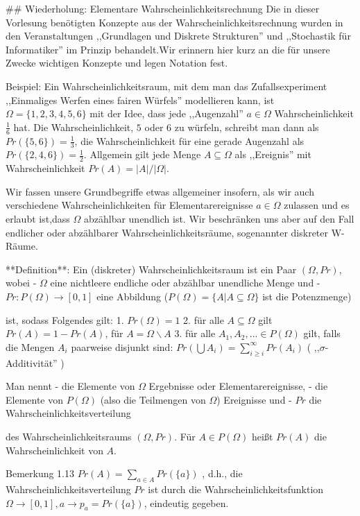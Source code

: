 \documentclass[a4paper]{article}
\begin{document}
\begin{multicols}{3}
    ## Wiederholung: Elementare Wahrscheinlichkeitsrechnung
    Die in dieser Vorlesung benötigten Konzepte aus der Wahrscheinlichkeitsrechnung wurden in den Veranstaltungen ,,Grundlagen und Diskrete Strukturen'' und ,,Stochastik für Informatiker'' im Prinzip behandelt.Wir erinnern hier kurz an die für unsere Zwecke wichtigen Konzepte und legen Notation fest.

    Beispiel: Ein Wahrscheinlichkeitsraum, mit dem man das Zufallsexperiment ,,Einmaliges Werfen eines fairen Würfels'' modellieren kann, ist $\Omega=\{ 1 , 2 , 3 , 4 , 5 , 6\}$ mit der Idee, dass jede  ,,Augenzahl'' $a\in\Omega$ Wahrscheinlichkeit $\frac{1}{6}$ hat. Die Wahrscheinlichkeit, $5$ oder $6$ zu würfeln, schreibt man dann als $Pr(\{5,6\})=\frac{1}{3}$, die Wahrscheinlichkeit für eine gerade Augenzahl als $Pr(\{2,4,6\})=\frac{1}{2}$. Allgemein gilt jede Menge $A\subseteq\Omega$ als ,,Ereignis''  mit Wahrscheinlichkeit $Pr(A) =|A|/|\Omega|$.

    Wir fassen unsere Grundbegriffe etwas allgemeiner insofern, als wir auch verschiedene Wahrscheinlichkeiten für Elementarereignisse $a\in\Omega$ zulassen und es erlaubt ist,dass $\Omega$ abzählbar unendlich ist. Wir beschränken uns aber auf den Fall endlicher oder abzählbarer Wahrscheinlichkeitsräume, sogenannter diskreter W-Räume.

    **Definition**: Ein (diskreter) Wahrscheinlichkeitsraum ist ein Paar $(\Omega,Pr)$, wobei
    - $\Omega$ eine nichtleere endliche oder abzählbar unendliche Menge und
    - $Pr:P(\Omega)\rightarrow[0,1]$ eine Abbildung ($P(\Omega)=\{A|A\subseteq\Omega\}$ ist die Potenzmenge)

    ist, sodass Folgendes gilt:
    1. $Pr(\Omega) = 1$
    2. für alle $A\subseteq\Omega$ gilt $Pr(A)=1-Pr(A)$, für $A=\Omega\backslash A$
    3. für alle $A_1,A_2,...\in P(\Omega)$ gilt, falls die Mengen $A_i$ paarweise disjunkt sind: $Pr(\bigcup A_i)=\sum_{i\geq i}^{\infty} Pr(A_i)$ ( ,,$\sigma$-Additivität'' )

    Man nennt
    - die Elemente von $\Omega$ Ergebnisse oder Elementarereignisse,
    - die Elemente von $P(\Omega)$ (also die Teilmengen von $\Omega$) Ereignisse und
    - $Pr$ die Wahrscheinlichkeitsverteilung

    des Wahrscheinlichkeitsraums $(\Omega,Pr)$. Für $A\in P(\Omega)$ heißt $Pr(A)$ die Wahrscheinlichkeit von $A$.

    Bemerkung 1.13 $Pr(A) =\sum_{a\in A} Pr(\{a\})$ , d.h., die Wahrscheinlichkeitsverteilung $Pr$ ist durch die Wahrscheinlichkeitsfunktion $\Omega\rightarrow[0,1],a \rightarrow p_a= Pr(\{a\})$, eindeutig gegeben.


\end{multicols}
\end{document}
